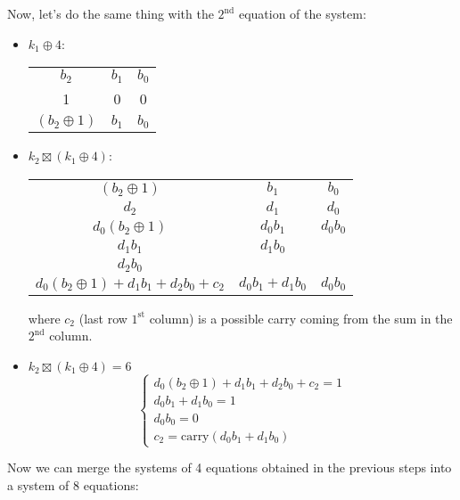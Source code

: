\newpage
\hfill\break
Now, let's do the same thing with the $2^{\text{nd}}$ equation of the system:
\begin{itemize}
    \item $k_1\oplus4$:
    \begin{center}
        \begin{tabular}{ccc}
            $b_2$&$b_1$&$b_0$\\
            1&0&0\\
            \hline
            $(b_2\oplus1)$&$b_1$&$b_0$
        \end{tabular}
    \end{center}
    \item $k_2\boxtimes(k_1\oplus4)$:
    \begin{center}
        \begin{tabular}{c|c|c}
            $(b_2\oplus1)$&$b_1$&$b_0$\\
            $d_2$&$d_1$&$d_0$\\
            \hline
            $d_0(b_2\oplus1)$&$d_0b_1$&$d_0b_0$\\
            $d_1b_1$&$d_1b_0$&\\
            $d_2b_0$&&\\
            \hline
            $d_0(b_2\oplus1)+d_1b_1+d_2b_0+c_2$&$d_0b_1+d_1b_0$&$d_0b_0$
        \end{tabular}
    \end{center}
    where $c_2$ (last row $1^{\text{st}}$ column) is a possible carry coming from the sum in the $2^{\text{nd}}$ column.
    \item $k_2\boxtimes(k_1\oplus4)=6$
    \begin{equation*}
        \begin{cases}
            d_0(b_2\oplus1)+d_1b_1+d_2b_0+c_2=1\\
            d_0b_1+d_1b_0=1\\
            d_0b_0=0\\
            c_2=\text{carry}(d_0b_1+d_1b_0)
        \end{cases}
    \end{equation*}
\end{itemize}
Now we can merge the systems of 4 equations obtained in the previous steps into a system of 8 equations:
